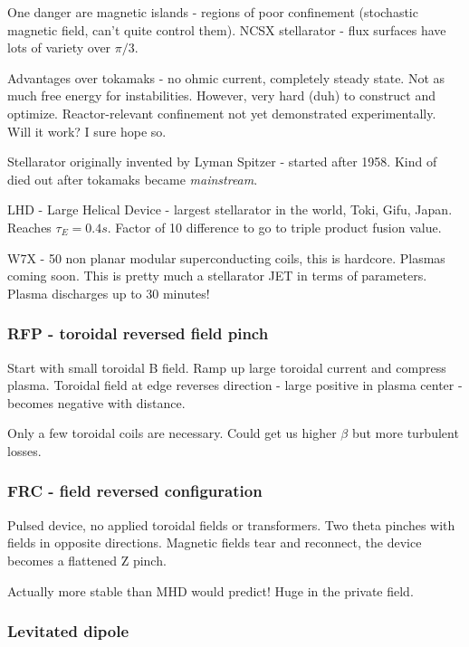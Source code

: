 \documentclass[PlasmaNotes.tex]{subfiles}
\begin{document}
      One danger are magnetic islands - regions of poor confinement (stochastic magnetic field, can't quite control them). NCSX stellarator - flux surfaces have lots of variety over $\pi/3$.
      
      Advantages over tokamaks - no ohmic current, completely steady state. Not as much free energy for instabilities. However, very hard (duh) to construct and optimize. Reactor-relevant confinement not yet demonstrated experimentally. Will it work? I sure hope so.
      
      Stellarator originally invented by Lyman Spitzer - started after 1958. Kind of died out after tokamaks became \emph{mainstream}.
      
      LHD - Large Helical Device - largest stellarator in the world, Toki, Gifu, Japan. Reaches $\tau_E=0.4s$. Factor of 10 difference to go to triple product fusion value.
      
      W7X - 50 non planar modular superconducting coils, this is hardcore. Plasmas coming soon. This is pretty much a stellarator JET in terms of parameters. Plasma discharges up to 30 minutes!
  
  \subsubsection{RFP - toroidal reversed field pinch}
  
    Start with small toroidal B field. Ramp up large toroidal current and compress plasma. Toroidal field at edge reverses direction - large positive in plasma center - becomes negative with distance.
    
    Only a few toroidal coils are necessary. Could get us higher $\beta$ but more turbulent losses.
    
  \subsubsection{FRC - field reversed configuration}
  
    Pulsed device, no applied toroidal fields or transformers. Two theta pinches with fields in opposite directions. Magnetic fields tear and reconnect, the device becomes a flattened Z pinch.
    
    Actually more stable than MHD would predict! Huge in the private field.
  
  \subsubsection{Levitated dipole}
  
\end{document}
